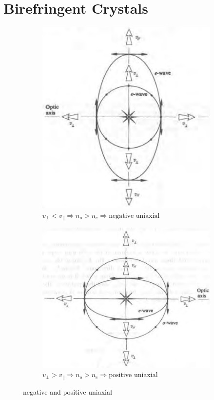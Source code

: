 \section{Birefringent Crystals}

\begin{figure}[H]
  \centering
  \begin{subfigure}{.5\textwidth}
    \centering
    \includegraphics[width=0.7\linewidth]{figures/negative-uniaxial}
    \caption{$v_{\perp} < v_{\parallel} \Rightarrow n_o > n_e \Rightarrow \text{negative uniaxial}$}
    \label{fig:}
  \end{subfigure}%
  \begin{subfigure}{.5\textwidth}
    \centering
    \includegraphics[width=0.7\linewidth]{figures/positive-uniaxial}
    \caption{$v_{\perp} > v_{\parallel} \Rightarrow n_o > n_e \Rightarrow \text{positive uniaxial}$}
    \label{fig:}
  \end{subfigure}
  \caption{negative and positive uniaxial}
  \label{fig:}
\end{figure}

